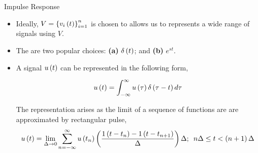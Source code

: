 \documentclass[aspectratio=169]{beamer}
\def\lp{\ensuremath\left(}
\def\rp{\ensuremath\right)}
\def\lc{\ensuremath\left\{}
\def\rc{\ensuremath\right\}}
\begin{document}
\begin{frame}{Impulse Response}
\begin{center}
\end{center}

\begin{itemize}    
    \item Ideally, $V = \lc v_i\lp t\rp \rc_{i=1}^n$ is chosen to allows us to represents a wide range of signals using $V$.
    
    \item The are two popular choices: \textbf{(a)} $\delta\lp t \rp$; and \textbf{(b)} $e^{st}$.

    \item A signal $u\lp t\rp$ can be represented in the following form,

    \[ u\lp t\rp = \int_{-\infty}^{\infty} u\lp \tau \rp \delta\lp \tau - t\rp d\tau \]
    
    The representation arises as the limit of a sequence of functions are are approximated by rectangular pulse,
    \[ u\lp t \rp = \lim_{\Delta \to 0} \sum_{n=-\infty}^{\infty} u\lp t_n \rp \lp \frac{1\lp t - t_n\rp - 1\lp t - t_{n+1}\rp}{\Delta}\rp \Delta; \,\,\, n\Delta \leq t < \lp n+1\rp\Delta  \]   
\end{itemize}
\end{frame}
\end{document}
